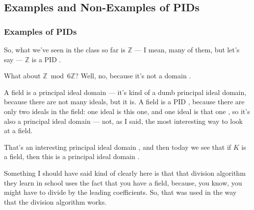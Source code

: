 \subsection{Examples and Non-Examples of PIDs}

\subsubsection{Examples of PIDs}

\begin{speech}[00:38:52 - 00:40:13]
So, what we've seen in the class so far is $\mathbb{Z}$ --- I mean, many of them, but let's say --- $\mathbb{Z}$ is a PID .

What about $\mathbb{Z} \bmod 6\mathbb{Z}$? Well, no, because it's not a domain .

A field is a principal ideal domain --- it's kind of a dumb principal ideal domain, because there are not many ideals, but it is. A field is a PID , because there are only two ideals in the field: one ideal is this one, and one ideal is that one , so it's also a principal ideal domain --- not, as I said, the most interesting way to look at a field.

That's an interesting principal ideal domain , and then today we see that if $K$ is a field, then this is a principal ideal domain .

Something I should have said kind of clearly here is that that division algorithm they learn in school uses the fact that you have a field, because, you know, you might have to divide by the leading coefficients. So, that was used in the way that the division algorithm works.
\end{speech}


